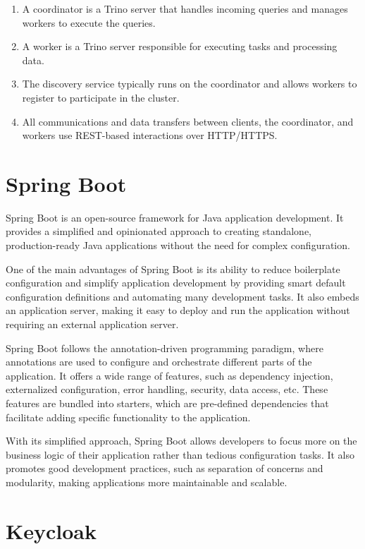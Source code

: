 \begin{enumerate}
\item A coordinator is a Trino server that handles incoming queries and manages workers to execute the queries.
\item A worker is a Trino server responsible for executing tasks and processing data.
\item The discovery service typically runs on the coordinator and allows workers to register to participate in the cluster.
\item All communications and data transfers between clients, the coordinator, and workers use REST-based interactions over HTTP/HTTPS.
\end{enumerate}

\section{Spring Boot}

Spring Boot is an open-source framework for Java application development. It provides a simplified and opinionated approach to creating standalone, production-ready Java applications without the need for complex configuration.

One of the main advantages of Spring Boot is its ability to reduce boilerplate configuration and simplify application development by providing smart default configuration definitions and automating many development tasks. It also embeds an application server, making it easy to deploy and run the application without requiring an external application server.

Spring Boot follows the annotation-driven programming paradigm, where annotations are used to configure and orchestrate different parts of the application. It offers a wide range of features, such as dependency injection, externalized configuration, error handling, security, data access, etc. These features are bundled into starters, which are pre-defined dependencies that facilitate adding specific functionality to the application.

With its simplified approach, Spring Boot allows developers to focus more on the business logic of their application rather than tedious configuration tasks. It also promotes good development practices, such as separation of concerns and modularity, making applications more maintainable and scalable.

\section{Keycloak}

